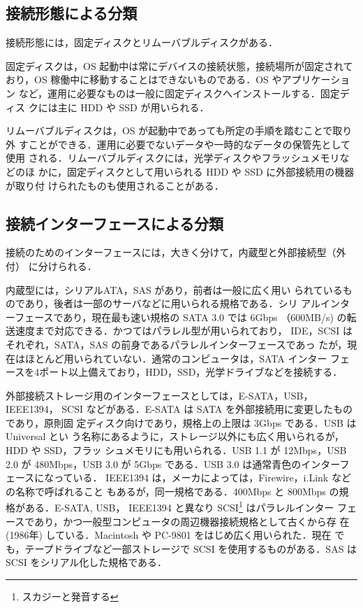 \subsection*{接続形態による分類}

接続形態には，固定ディスクとリムーバブルディスクがある．

固定ディスクは，OS 起動中は常にデバイスの接続状態，接続場所が固定されて
おり，OS 稼働中に移動することはできないものである．OS やアプリケーション
など，運用に必要なものは一般に固定ディスクへインストールする．固定ディス
クには主に HDD や SSD が用いられる．

リムーバブルディスクは，OS が起動中であっても所定の手順を踏むことで取り外
すことができる．運用に必要でないデータや一時的なデータの保管先として使用
される．リムーバブルディスクには，光学ディスクやフラッシュメモリなどのほ
かに，固定ディスクとして用いられる HDD や SSD に外部接続用の機器が取り付
けられたものも使用されることがある．

\subsection*{接続インターフェースによる分類}

接続のためのインターフェースには，大きく分けて，内蔵型と外部接続型（外付）
に分けられる．

内蔵型には，シリアルATA，SAS があり，前者は一般に広く用い
られているものであり，後者は一部のサーバなどに用いられる規格である．シリ
アルインターフェースであり，現在最も速い規格の SATA 3.0 では 6Gbps 
（600MB/s) の転送速度まで対応できる．かつてはパラレル型が用いられており，
IDE，SCSI はそれぞれ，SATA，SAS の前身であるパラレルインターフェースであっ
たが，現在はほとんど用いられていない．通常のコンピュータは，SATA インター
フェースを4ポート以上備えており，HDD，SSD，光学ドライブなどを接続する．

外部接続ストレージ用のインターフェースとしては，E-SATA，USB，IEEE1394，
SCSI などがある．E-SATA は SATA を外部接続用に変更したものであり，原則固
定ディスク向けであり，規格上の上限は 3Gbps である．USB は Universal とい
う名称にあるように，ストレージ以外にも広く用いられるが，HDD や SSD，フラッ
シュメモリにも用いられる．USB 1.1 が 12Mbps，USB 2.0 が 480Mbps，USB 3.0 
が 5Gbps である．USB 3.0 は通常青色のインターフェースになっている．
IEEE1394 は，メーカによっては，Firewire，i.Link などの名称で呼ばれること
もあるが，同一規格である．400Mbps と 800Mbps の規格がある．E-SATA, USB，
IEEE1394 と異なり SCSI\footnote{スカジーと発音する} はパラレルインター
フェースであり，かつ一般型コンピュータの周辺機器接続規格として古くから存
在 (1986年) している．Macintosh や PC-9801 をはじめ広く用いられた．現在
でも，テープドライブなど一部ストレージで SCSI を使用するものがある．SAS 
は SCSI をシリアル化した規格である．


